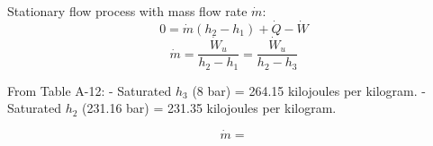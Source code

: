 Stationary flow process with mass flow rate \( \dot{m} \):  
\[ 0 = \dot{m} (h_2 - h_1) + \dot{Q} - \dot{W} \]  
\[ \dot{m} = \frac{\dot{W}_u}{h_2 - h_1} = \frac{\dot{W}_u}{h_2 - h_3} \]  

From Table A-12:  
- Saturated \( h_3 \) (8 bar) = 264.15 kilojoules per kilogram.  
- Saturated \( h_2 \) (231.16 bar) = 231.35 kilojoules per kilogram.  

\[ \dot{m} = \]